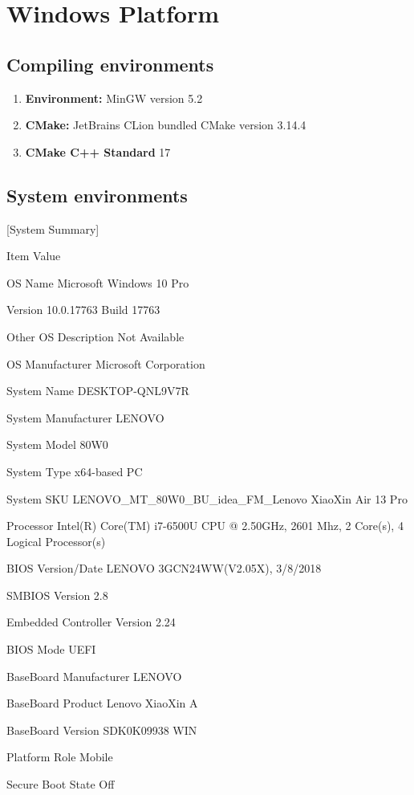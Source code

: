 \documentclass[a4paper]{report}
\begin{document}
\section{Windows Platform}
\subsection{Compiling environments}
\begin{enumerate}
\item
\textbf{Environment:} MinGW version 5.2
\item
\textbf{CMake:} JetBrains CLion bundled CMake version 3.14.4
\item
\textbf{CMake C++ Standard} 17
\end{enumerate}
\subsection{System environments}
[System Summary]
\par
Item	Value	
\par
OS Name	Microsoft Windows 10 Pro	
\par
Version	10.0.17763 Build 17763	
\par
Other OS Description 	Not Available	
\par
OS Manufacturer	Microsoft Corporation	
\par
System Name	DESKTOP-QNL9V7R	
\par
System Manufacturer	LENOVO	
\par
System Model	80W0	
\par
System Type	x64-based PC	
\par
System SKU	LENOVO\_MT\_80W0\_BU\_idea\_FM\_Lenovo XiaoXin Air 13 Pro	
\par
Processor	Intel(R) Core(TM) i7-6500U CPU @ 2.50GHz, 2601 Mhz, 2 Core(s), 4 Logical Processor(s)	
\par
BIOS Version/Date	LENOVO 3GCN24WW(V2.05X), 3/8/2018	
\par
SMBIOS Version	2.8	
\par
Embedded Controller Version	2.24	
\par
BIOS Mode	UEFI	
\par
BaseBoard Manufacturer	LENOVO	
\par
BaseBoard Product	Lenovo XiaoXin A	
\par
BaseBoard Version	SDK0K09938 WIN	
\par
Platform Role	Mobile	
\par
Secure Boot State	Off	
\par
\end{document}

